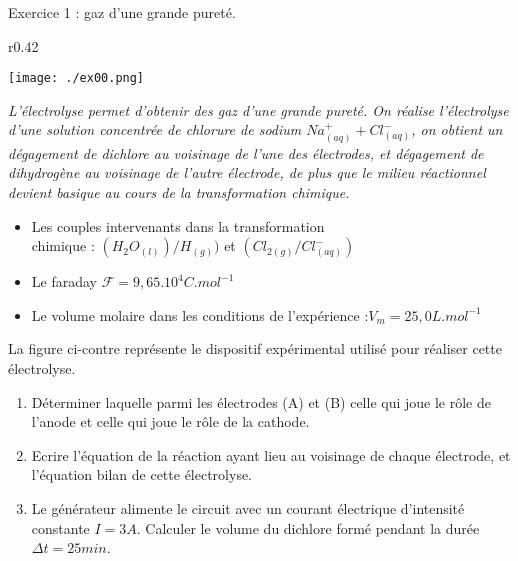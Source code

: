 \documentclass[12pt, french]{article}
\begin{document}
\begin{center}

\end{center}

\vspace{-0.2cm}
   \begin{Box2}{Exercice 1 : gaz d'une grande pureté.}
	   \begin{wrapfigure}[5]{r}{0.42\textwidth}
  \begin{center}
	  \vspace{-0.6cm}
	\texttt{[image: ./ex00.png]}
  \end{center}
\end{wrapfigure}
	   \emph{L'électrolyse permet d'obtenir des gaz d'une grande pureté.
On réalise l'électrolyse d'une solution concentrée de chlorure de sodium
$Na^+_{(aq)} + Cl^-_{(aq)}$, on obtient un dégagement de dichlore au voisinage de l’une des
électrodes, et dégagement de dihydrogène au voisinage de l'autre électrode, de plus
que le milieu réactionnel \\devient basique au cours de la transformation chimique.}

\begin{itemize}
	\item Les couples intervenants dans la transformation\\ chimique : $(H_2O_{(l)})/H_{(g)})$ et $(Cl_{2(g)}/Cl^-_{(aq)})$
	\item Le faraday $\mathscr{F}=9,65.10^4 C.mol^{-1}$
	\item Le volume molaire dans les conditions de l’expérience :$V_m = 25,0L.mol^{-1}$
\end{itemize}
La figure ci-contre représente le
dispositif expérimental utilisé pour
réaliser cette électrolyse.

\begin{enumerate}
	\item Déterminer laquelle parmi les
électrodes (A) et (B) celle qui
joue le rôle de l'anode et celle
qui joue le rôle de la cathode.

\item Ecrire l’équation de la réaction
ayant lieu au voisinage de
chaque électrode, et l'équation
bilan de cette électrolyse.

\item Le générateur alimente le circuit avec un courant électrique d'intensité constante
	$I = 3A$. Calculer le volume du dichlore formé pendant la durée $\Delta{t} = 25 min$.
\end{enumerate}


   \end{Box2}
\end{document}
